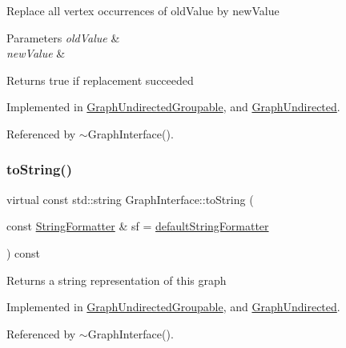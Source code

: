Replace all vertex occurrences of old\+Value by new\+Value


\begin{DoxyParams}{Parameters}
{\em old\+Value} & \\
\hline
{\em new\+Value} & \\
\hline
\end{DoxyParams}
\begin{DoxyReturn}{Returns}
true if replacement succeeded 
\end{DoxyReturn}


Implemented in \hyperlink{classGraphUndirectedGroupable_a164600ca9727676ad7b370b9061927d4}{Graph\+Undirected\+Groupable}, and \hyperlink{classGraphUndirected_aee3bc279ffe39f8efb7dd60865279474}{Graph\+Undirected}.



Referenced by $\sim$\+Graph\+Interface().

\mbox{\label{classGraphInterface_ac6d3da524ca5c95c3ebd80d2b0d5d762}} 
\subsubsection{\texorpdfstring{to\+String()}{toString()}}
{\footnotesize\ttfamily virtual const std\+::string Graph\+Interface\+::to\+String (\begin{DoxyParamCaption}\item[{const \hyperlink{classStringFormatter}{String\+Formatter} \&}]{sf = {\ttfamily \hyperlink{stringFormatter_8h_abf1349c8e24162d0134072aff288f2a2}{default\+String\+Formatter}} }\end{DoxyParamCaption}) const\hspace{0.3cm}{\ttfamily [pure virtual]}}

\begin{DoxyReturn}{Returns}
a string representation of this graph 
\end{DoxyReturn}


Implemented in \hyperlink{classGraphUndirectedGroupable_a615f30036acfdd33e45b82dc47e7d174}{Graph\+Undirected\+Groupable}, and \hyperlink{classGraphUndirected_a61604a0840f044d52a2762f44635fa9c}{Graph\+Undirected}.



Referenced by $\sim$\+Graph\+Interface().

\mbox{\label{classGraphInterface_a3bf10ae8e4fc3b049b5e7ac23798b89f}} 
